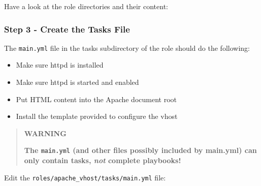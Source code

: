 Have a look at the role directories and their content:

\begin{Shaded}
\begin{Highlighting}[]
\ExtensionTok{[student@controller}\NormalTok{ ansible{-}files]$ tree roles}
\end{Highlighting}
\end{Shaded}

\begin{Shaded}
\begin{Highlighting}[]
\end{Highlighting}
\end{Shaded}

\hypertarget{step-3---create-the-tasks-file}{%
\subsubsection{Step 3 - Create the Tasks
File}\label{step-3---create-the-tasks-file}}

The \texttt{main.yml} file in the tasks subdirectory of the role should
do the following:

\begin{itemize}
\tightlist
\item
  Make sure httpd is installed
\item
  Make sure httpd is started and enabled
\item
  Put HTML content into the Apache document root
\item
  Install the template provided to configure the vhost
\end{itemize}

\begin{quote}
\textbf{WARNING}

\textbf{The \texttt{main.yml} (and other files possibly included by
main.yml) can only contain tasks, \emph{not} complete playbooks!}
\end{quote}

Edit the \texttt{roles/apache\_vhost/tasks/main.yml} file:

